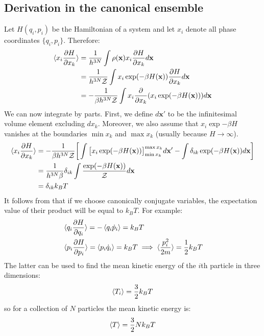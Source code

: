 \documentclass[a4paper,11pt,oneside]{book}
\begin{document}
\subsection*{Derivation in the canonical ensemble}
Let $H(q_i,p_i)$ be the Hamiltonian of a system and let $x_i$ denote all phase coordinates $\{q_i,p_i\}$. Therefore:
\begin{align}
    \braket{x_i \frac{\partial H}{\partial x_k}} &= \frac{1}{h^{3N}} \int \rho(\textbf{x}) x_i \frac{\partial H}{\partial x_k} d\textbf{x}\\
    &= \frac{1}{h^{3N}\mathcal{Z}} \int x_i \exp(-\beta H(\textbf{x})) \frac{\partial H}{\partial x_k} d\textbf{x}\\
    &= -\frac{1}{\beta h^{3N}\mathcal{Z}} \int x_i \frac{\partial}{\partial x_k}(x_i\exp(-\beta H(\textbf{x}))) d\textbf{x}
    \end{align}
We can now integrate by parts. First, we define $d\textbf{x}'$ to be the infinitesimal volume element excluding $dx_k$. Moreover, we also assume that $x_i\exp{-\beta H}$ vanishes at the boundaries $\min x_k$ and $\max x_k$ (usually because $H\rightarrow \infty$). 
    \begin{align}
  \braket{x_i \frac{\partial H}{\partial x_k}}  &=  -\frac{1}{\beta h^{3N}\mathcal{Z}} \bigg[\int \big[x_i \exp(-\beta H(\textbf{x}))\big]^{\max x_k}_{\min x_k} d\textbf{x}'-\int \delta_{ik} \exp(-\beta H(\textbf{x})) d\textbf{x}\bigg]\\
    &= \frac{1}{h^{3N} \beta}\delta_{ik} \int\frac{\exp(-\beta H(\textbf{x}))}{\mathcal{Z}} d\textbf{x}\\
    &= \delta_{ik} k_B T
\end{align}
It follows from that if we choose canonically conjugate variables, the expectation value of their product will be equal to $k_B T$. For example:
\begin{align}
    &\braket{q_i \frac{\partial H}{\partial q_i}} = -\braket{q_i \dot{p}_i} =k_B T\\
    &\braket{p_i\frac{\partial H}{\partial p_i}} = \braket{p_i \dot{q}_i} = k_B T \implies \braket{\frac{p_i^2}{2m}} = \frac{1}{2}k_B T
\end{align}
The latter can be used to find the mean kinetic energy of the $i$th particle in three dimensions:
\begin{equation}
    \braket{T_i} = \frac{3}{2}k_B T
\end{equation}
so for a collection of $N$ particles the mean kinetic energy is:
\begin{equation}
      \braket{T} = \frac{3}{2}Nk_B T
\end{equation}
\end{document}

